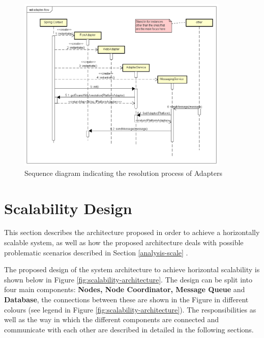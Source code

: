 \begin{figure}[!htb]
	\centering
	\includegraphics[width=0.9\textwidth]{figures/03_design/adapter-flow}
    \caption{Sequence diagram indicating the resolution process of Adapters}
    \label{fig:adapter-flow}
\end{figure}

\clearpage

\section{Scalability Design}
This section describes the architecture proposed in order to achieve a horizontally scalable system, as well as how the proposed architecture deals with possible problematic scenarios described in Section \ref{analysis-scale} .

The proposed design of the system architecture to achieve horizontal scalability is shown below in Figure \ref{fig:scalability-architecture}. The design can be split into four main components: \textbf{Nodes, Node Coordinator, Message Queue} and \textbf{Database}, the connections between these are shown in the Figure in different colours (see legend in Figure \ref{fig:scalability-architecture}). The responsibilities as well as the way in which the different components are connected and communicate with each other are described in detailed in the following sections.

